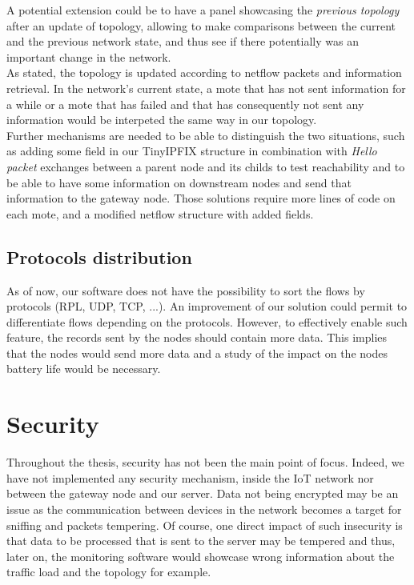 A potential extension could be to have a panel showcasing the \textit{previous topology} after an update of topology, allowing to make comparisons between the current and the previous network state, and thus see if there potentially was an important change in the network.\\

As stated, the topology is updated according to netflow packets and information retrieval. In the network's current state, a mote that has not sent information for a while or a mote that has failed and that has consequently not sent any information would be interpeted the same way in our topology. \\

Further mechanisms are needed to be able to distinguish the two situations, such as adding some field in our TinyIPFIX structure in combination with \textit{Hello packet} exchanges between a parent node and its childs to test reachability and to be able to have some information on downstream nodes and send that information to the gateway node. Those solutions require more lines of code on each mote, and a modified netflow structure with added fields.



\subsection{Protocols distribution}

As of now, our software does not have the possibility to sort the flows by protocols (RPL, UDP, TCP, ...). An improvement of our solution could permit to differentiate flows depending on the protocols. However, to effectively enable such feature, the records sent by the nodes should contain more data. This implies that the nodes would send more data and a study of the impact on the nodes battery life would be necessary.

\section{Security}

Throughout the thesis, security has not been the main point of focus. Indeed, we have not implemented any security mechanism, inside the IoT network nor between the gateway node and our server. Data not being encrypted may be an issue as the communication between devices in the network becomes a target for sniffing and packets tempering. Of course, one direct impact of such insecurity is that data to be processed that is sent to the server may be tempered and thus, later on, the monitoring software would showcase wrong information about the traffic load and the topology for example.\\

